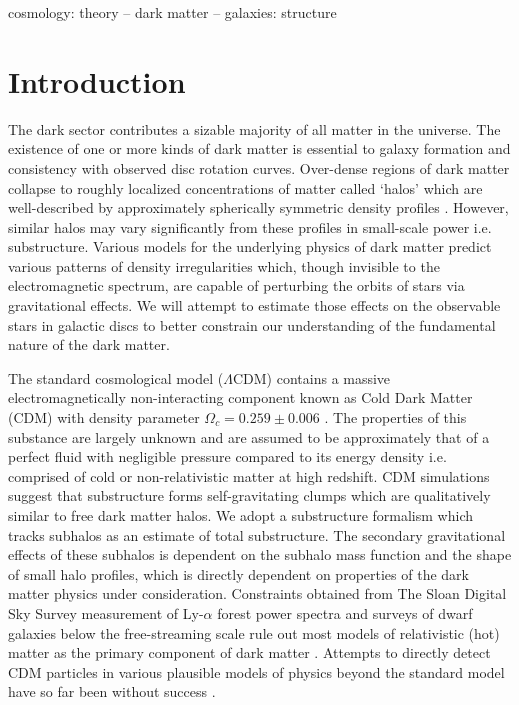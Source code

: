 \documentclass[usenatbib]{mnras}
\newcommand{\lcdm}{$\Lambda$CDM}
\begin{document}
\begin{keywords}
cosmology: theory -- dark matter -- galaxies: structure
\end{keywords}

\section{Introduction}

The dark sector contributes a sizable majority of all matter in the universe. The existence of one or more kinds of dark matter is essential to galaxy formation and consistency with observed disc rotation curves. Over-dense regions of dark matter collapse to roughly localized concentrations of matter called ‘halos’ which are well-described by approximately spherically symmetric density profiles \citep{structure}. However, similar halos may vary significantly from these profiles in small-scale power i.e. substructure. Various models for the underlying physics of dark matter predict various patterns of density irregularities which, though invisible to the electromagnetic spectrum, are capable of perturbing the orbits of stars via gravitational effects. We will attempt to estimate those effects on the observable stars in galactic discs to better constrain our understanding of the fundamental nature of the dark matter.
             
\par 

The standard cosmological model (\lcdm) contains a massive electromagnetically non-interacting component known as Cold Dark Matter (CDM) with density parameter $\Omega_c = 0.259 \pm 0.006$ \citep{planck}. The properties of this substance are largely unknown and are assumed to be approximately that of a perfect fluid with negligible pressure compared to its energy density i.e. comprised of cold or non-relativistic matter at high redshift. CDM simulations suggest that substructure forms self-gravitating clumps which are qualitatively similar to free dark matter halos. We adopt a substructure formalism which tracks subhalos as an estimate of total substructure. The secondary gravitational effects of these subhalos is dependent on the subhalo mass function and the shape of small halo profiles, which is directly dependent on properties of the dark matter physics under consideration. Constraints obtained from The Sloan Digital Sky Survey measurement of Ly-$\alpha$ forest power spectra and surveys of dwarf galaxies below the free-streaming scale rule out most models of relativistic (hot) matter as the primary component of dark matter \citep{can_neutrinos}. Attempts to directly detect CDM particles in various plausible models of physics beyond the standard model have so far been without success \citep{direct_detection}.
	  
\end{document}
